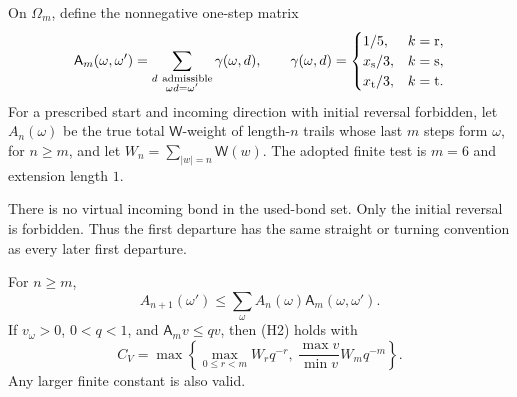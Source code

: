 \begin{definition}\label{d:memorygrowth}
On \(\Omega_m\), define the nonnegative one-step matrix
\[
 \mathsf A_m(\omega,\omega')=
 \sum_{\substack{d\ {\rm admissible}\\\omega d=\omega'}}
 \gamma(\omega,d),\qquad
 \gamma(\omega,d)=
 \begin{cases}1/5,&k={\rm r},\\
 x_{\rm s}/3,&k={\rm s},\\x_{\rm t}/3,&k={\rm t}.
 \end{cases}
\]
For a prescribed start and incoming direction with initial reversal
forbidden, let \(A_n(\omega)\) be the true total \(\mathsf W\)-weight
of length-\(n\) trails whose last \(m\) steps form \(\omega\),
for \(n\ge m\), and let \(W_n=\sum_{|w|=n}\mathsf W(w)\).
The adopted finite test is \(m=6\) and extension length \(1\).
\end{definition}

There is no virtual incoming bond in the used-bond set. Only the
initial reversal is forbidden. Thus the first departure has the same
straight or turning convention as every later first departure.

\begin{lemma}\label{l:alm}
For \(n\ge m\),
\[
 A_{n+1}(\omega')\le\sum_\omega A_n(\omega)\mathsf A_m(\omega,\omega').
\]
If \(v_\omega>0\), \(0<q<1\), and \(\mathsf A_mv\le qv\),
then (H2) holds with
\[
 C_V=\max\left\{
      \max_{0\le r<m}W_rq^{-r},\
      \frac{\max v}{\min v}W_mq^{-m}\right\}.
\]
Any larger finite constant is also valid.
\end{lemma}

